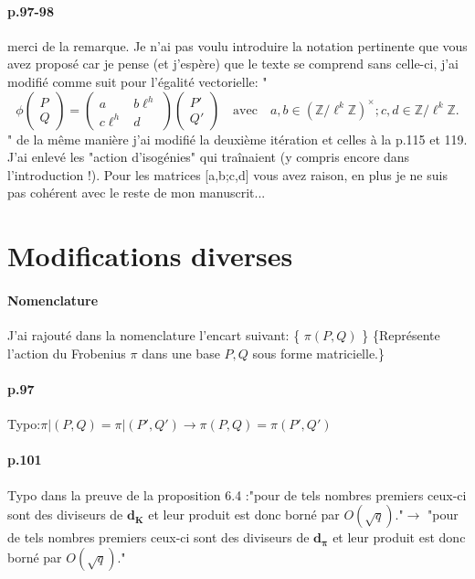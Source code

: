 \documentclass[10pt,a4paper]{article}
\theoremstyle{plain}
\theoremstyle{definition}
\theoremstyle{definition}
\theoremstyle{definition}
\theoremstyle{definition}
\theoremstyle{definition}
\theoremstyle{remark}
\theoremstyle{remark}
\theoremstyle{definition}
\begin{document}
\paragraph{p.97-98}{merci de la remarque. Je n'ai pas voulu introduire la 
notation pertinente que vous avez proposé car je pense (et j'espère) que le 
texte se comprend sans celle-ci, j'ai modifié comme suit pour l'égalité vectorielle:
"
\[
\phi \left(
\begin{matrix}
P \\
Q
\end{matrix}
\right)=
\left( 
\begin{matrix}
a &  b\ell^{h} \\
c\ell^{h} & d
\end{matrix}
\right)
\left(
\begin{matrix}
P' \\
Q'
\end{matrix}
\right) \quad \text{avec} \quad a,b \in \left( \mathbb{Z}/\ell^k\mathbb{Z} \right)^{\times}; c,d \in \mathbb{Z}/\ell^{k}\mathbb{Z}.
\]
" de la même manière j'ai modifié la deuxième itération et celles à la p.115 et
119. J'ai enlevé les "action d'isogénies" qui traînaient (y compris encore dans
l'introduction !). Pour les matrices [a,b;c,d] vous avez raison, en plus je ne 
suis pas cohérent avec le reste de mon manuscrit...
}


\section{Modifications diverses}
\paragraph{Nomenclature}{J'ai rajouté dans la nomenclature l'encart suivant:
\{ $\pi(P,Q)$ \} \{Représente l'action du Frobenius $\pi$ dans une base $P,Q$ sous forme matricielle.\} }

\paragraph{p.97}{ Typo:$\pi|(P,Q)=\pi|(P',Q') \rightarrow \pi(P,Q)=\pi(P',Q')$}

\paragraph{p.101} Typo dans la preuve de la proposition 6.4 :"pour de tels nombres premiers ceux-ci sont des diviseurs de $\mathbf{d_{K}}$ et leur 
  produit est donc borné par $O(\sqrt{q})$."$\rightarrow$ "pour de tels nombres premiers ceux-ci sont des diviseurs de $\mathbf{d_{\pi}}$ et leur 
  produit est donc borné par $O(\sqrt{q})$." 

\end{document}
